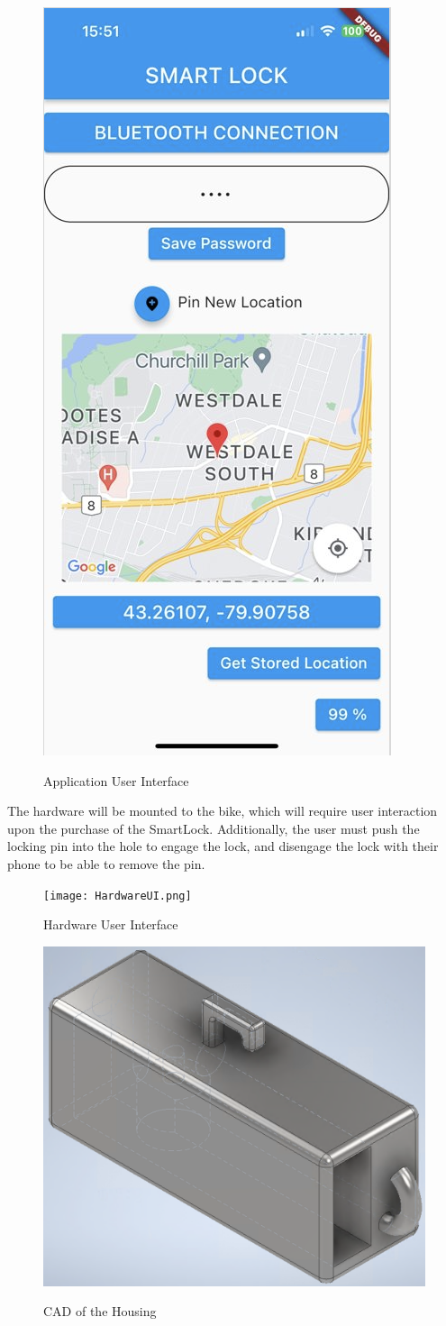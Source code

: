 \documentclass[12pt, titlepage]{article}
\begin{document}
 \begin{figure}[h!]
 \begin{center}
 {
  \includegraphics[width=0.38\linewidth]{UI.png}
 }
 \caption{\label{Application User Interface} Application User Interface}
 \end{center}
 \end{figure}

The hardware will be mounted to the bike, which will require user interaction upon the purchase of the SmartLock. Additionally, the user must push the locking pin into the hole to engage the lock, and disengage the lock with their phone to be able to remove the pin. 

 \begin{figure}[h!]
 \begin{center}
 {
  \texttt{[image: HardwareUI.png]}
 }
 \caption{\label{Hardware User Interface} Hardware User Interface}
 \end{center}
 \end{figure}
 
  \begin{figure}[h!]
 \begin{center}
 {
  \includegraphics[width=0.4\linewidth]{11.png}
 }
 \caption{\label{CAD of the Housing} CAD of the Housing}
 \end{center}
 \end{figure}
 
\end{document}
